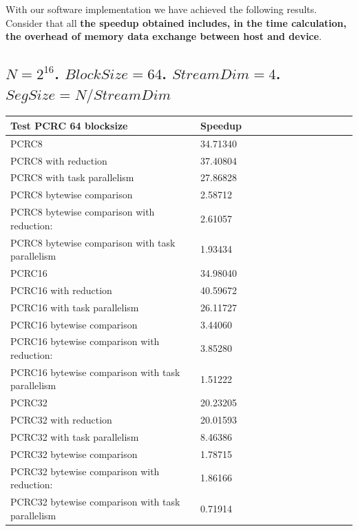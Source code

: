 \documentclass[fleqn]{IEEEtran}
\begin{document}
With our software implementation we have achieved the following results. Consider that all \textbf{the speedup obtained includes, in the time calculation, the overhead of memory data exchange between host and device}.

\subsection{$N=2^{16}$. $BlockSize=64$. $StreamDim=4$. $SegSize=N/StreamDim$}
\begin{footnotesize}
\begin{tabular}{l|l|l|l|l|r|r|r|r|r|r||c|c|}
\toprule
\textbf{Test PCRC 64 blocksize} & \textbf{Speedup} \\
\midrule
PCRC8                                           &	34.71340 \\
PCRC8 with reduction                            &	37.40804 \\
PCRC8 with task parallelism                     &	27.86828 \\
PCRC8 bytewise comparison                       &	2.58712  \\
PCRC8 bytewise comparison with reduction:       &	2.61057  \\
PCRC8 bytewise comparison with task parallelism &	1.93434  \\
PCRC16                                           &	34.98040 \\
PCRC16 with reduction                            &	40.59672 \\
PCRC16 with task parallelism                     &	26.11727 \\
PCRC16 bytewise comparison                       &	3.44060  \\
PCRC16 bytewise comparison with reduction:       &	3.85280  \\
PCRC16 bytewise comparison with task parallelism &	1.51222  \\
PCRC32                                           &	20.23205 \\
PCRC32 with reduction                            &	20.01593 \\
PCRC32 with task parallelism                     &	8.46386  \\
PCRC32 bytewise comparison                       &	1.78715  \\
PCRC32 bytewise comparison with reduction:       &	1.86166  \\
PCRC32 bytewise comparison with task parallelism &	0.71914  \\
\bottomrule
\end{tabular}
\end{footnotesize}
\end{document}
